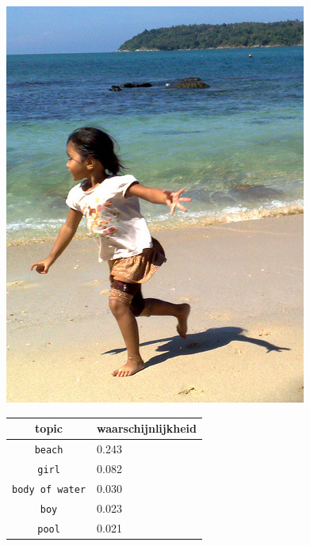 \begin{figure}[h]
    \centering
    \begin{minipage}[t]{.5\linewidth}
    \centering
    \vspace{0pt}
    \includegraphics[width=\textwidth]{Images/LDA/3107059919.jpg}
    \end{minipage}\hfill
    \begin{minipage}[t]{.5\textwidth}
    \centering
    \vspace{0pt}
    \begin{tabular}{cl}
            topic                           & waarschijnlijkheid\\
            \hline
            \texttt{beach}             & 0.243 \\
            \texttt{girl}                   & 0.082 \\
            \texttt{body of water}                 & 0.030 \\
            \texttt{boy}           & 0.023 \\
            \texttt{pool}        & 0.021\\
            \hline
        \end{tabular}
    \end{minipage}
\end{figure}

